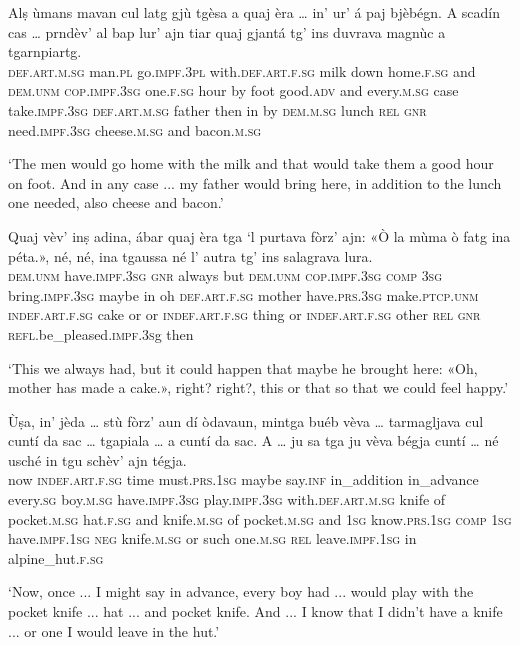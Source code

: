\begin{linenumbers}
	\gll Alṣ ùmans mavan cul latg gjù tgèsa a quaj èra … in' ur’ á paj bjèbégn. A scadín cas … prndèv’ al bap lur’ ajn tiar quaj gjantá tg’ ins duvrava magnùc a tgarnpiartg.   \\
	\textsc{def.art.m.sg} man.\textsc{pl} go.\textsc{impf.3pl} with.\textsc{def.art.f.sg} milk down home.\textsc{f.sg} and \textsc{dem.unm} \textsc{cop.impf.3sg} {} one.\textsc{f.sg} hour by foot good.\textsc{adv} and every.\textsc{m.sg} case {} take.\textsc{impf.3sg} \textsc{def.art.m.sg} father then in by \textsc{dem.m.sg} lunch \textsc{rel} \textsc{gnr} need.\textsc{impf.3sg} cheese.\textsc{m.sg} and bacon.\textsc{m.sg} \\
\end{linenumbers}
\medskip
\glt `The men would go home with the milk and that would take them a good hour on foot. And in any case ... my father would bring here, in addition to the lunch one needed, also cheese and bacon.'
\medskip

\begin{linenumbers}
\gll Quaj vèv’ inṣ adina, ábar quaj èra tga `l purtava fòrz’ ajn: «Ò la mùma ò fatg ina péta.», né, né, ina tgaussa né l’ autra tg’ ins salagrava lura.\\
\textsc{dem.unm} have.\textsc{impf.3sg} \textsc{gnr} always but \textsc{dem.unm} \textsc{cop.impf.3sg} \textsc{comp} \textsc{3sg} bring.\textsc{impf.3sg} maybe in oh \textsc{def.art.f.sg} mother have.\textsc{prs.3sg} make.\textsc{ptcp.unm} \textsc{indef.art.f.sg} cake or or \textsc{indef.art.f.sg} thing or \textsc{indef.art.f.sg} other \textsc{rel} \textsc{gnr} \textsc{refl}.be\_pleased.\textsc{impf.3s}g then\\
\end{linenumbers}
\medskip
\glt `This we always had, but it could happen that maybe he brought here: «Oh, mother has made a cake.», right? right?, this or that so that we could feel happy.'
\medskip

\begin{linenumbers}
	\gll  Ùṣa, in' jèda … stù fòrz’ aun dí òdavaun, mintga buéb vèva … tarmagljava cul cuntí da sac … tgapiala … a cuntí da sac. A … ju sa tga ju vèva bégja cuntí … né usché in tgu schèv’ ajn tégja.\\
	now \textsc{indef.art.f.sg} time {} must.\textsc{prs.1sg} maybe say.\textsc{inf} in\_addition in\_advance every.\textsc{sg} boy.\textsc{m.sg} have.\textsc{impf.3sg} {} play.\textsc{impf.3sg} with.\textsc{def.art.m.sg} knife of pocket\textsc{.m.sg} {} hat.\textsc{f.sg} {} and knife.\textsc{m.sg} of pocket.\textsc{m.sg} and {} \textsc{1sg} know.\textsc{prs.1sg} \textsc{comp} \textsc{1sg} have.\textsc{impf.1sg} \textsc{neg} knife.\textsc{m.sg} {} or such one.\textsc{m.sg} \textsc{rel} leave.\textsc{impf.1sg} in alpine\_hut.\textsc{f.sg}  \\
\end{linenumbers}
\medskip
\glt `Now, once ... I might say in advance, every boy had ... would play with the pocket knife ... hat ... and pocket knife. And ... I know that I didn't have a knife ... or one I would leave in the hut.'
\medskip

